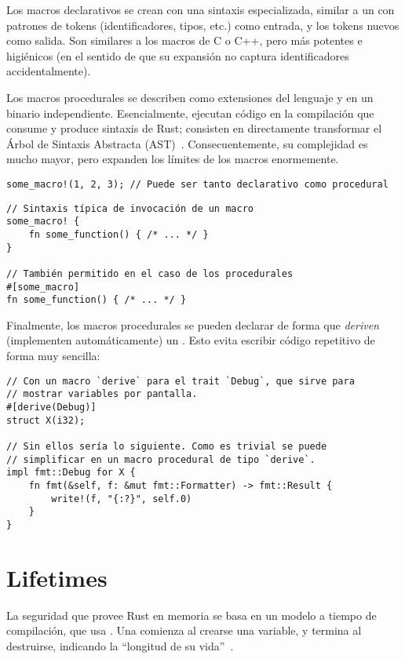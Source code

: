 Los macros declarativos se crean con una sintaxis especializada, similar a un
 con patrones de tokens (identificadores, tipos, etc.) como entrada,
y los tokens nuevos como salida. Son similares a los macros de C o C++, pero más
potentes e higiénicos (en el sentido de que su expansión no captura
identificadores accidentalmente).

Los macros procedurales se describen como extensiones del lenguaje y en un
binario independiente. Esencialmente, ejecutan código en la compilación que
consume y produce sintaxis de Rust; consisten en directamente transformar el
Árbol de Sintaxis Abstracta (AST)~\cite[Procedural Macros]{rustref}.
Consecuentemente, su complejidad es mucho mayor, pero expanden los límites de
los macros enormemente.

\begin{verbatim}
some_macro!(1, 2, 3); // Puede ser tanto declarativo como procedural
\end{verbatim}

\begin{verbatim}
// Sintaxis típica de invocación de un macro
some_macro! {
    fn some_function() { /* ... */ }
}

// También permitido en el caso de los procedurales
#[some_macro]
fn some_function() { /* ... */ }
\end{verbatim}

Finalmente, los macros procedurales se pueden declarar de forma que
\emph{deriven} (implementen automáticamente) un \trait. Esto evita escribir
código repetitivo de forma muy sencilla:

\begin{verbatim}
// Con un macro `derive` para el trait `Debug`, que sirve para
// mostrar variables por pantalla.
#[derive(Debug)]
struct X(i32);

// Sin ellos sería lo siguiente. Como es trivial se puede
// simplificar en un macro procedural de tipo `derive`.
impl fmt::Debug for X {
    fn fmt(&self, f: &mut fmt::Formatter) -> fmt::Result {
        write!(f, "{:?}", self.0)
    }
}
\end{verbatim}

\section{Lifetimes}

La seguridad que provee Rust en memoria se basa en un modelo a tiempo de
compilación, que usa \lifetimes. Una \lifetime comienza al crearse una variable,
y termina al destruirse, indicando la ``longitud de su
vida''~\cite[Lifetimes]{rustexample}.

